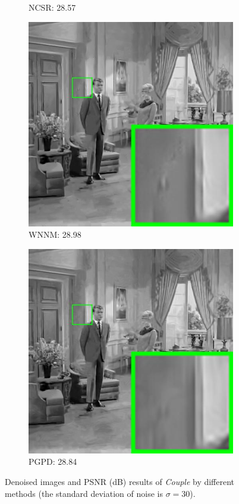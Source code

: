 \begin{figure}
\begin{subfigure}[t]{0.24\textwidth}
		\caption{NCSR: 28.57}
    \end{subfigure}
    \hfill
    \begin{subfigure}[t]{0.24\textwidth}
        \centering
        \includegraphics[width=1\textwidth]{images/pgpd/br_WNNM_30_couple.jpg}
		\caption{WNNM: 28.98}
    \end{subfigure}
    \hfill
    \begin{subfigure}[t]{0.24\textwidth}
        \centering
        \includegraphics[width=1\textwidth]{images/pgpd/br_our_30_couple.jpg}
		\caption{PGPD: 28.84}
    \end{subfigure}
    \caption{Denoised images and PSNR (dB) results of \textsl{Couple} by different methods (the standard deviation of noise is $\sigma=30$).}
    \label{fig2-10}
\end{figure}

